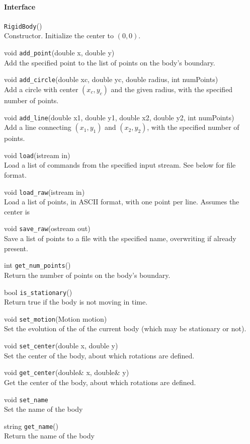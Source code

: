 \documentclass[11pt]{article}
\def\fn#1{{\tt #1}} %
\begin{document}
\paragraph{Interface}
\begin{description}
	\item \fn{RigidBody}() \\
		Constructor.  Initialize the center to $(0,0)$.
	\item void \fn{add\_point}(double x, double y) \\
		Add the specified point to the list of points on the body's boundary.
	\item void \fn{add\_circle}(double xc, double yc, double radius, int numPoints) \\
		Add a circle with center $(x_c,y_c)$ and the given radius, with the specified number of points.
	\item void \fn{add\_line}(double x1, double y1, double x2, double y2, int numPoints) \\
		Add a line connecting $(x_1,y_1)$ and $(x_2,y_2)$, with the specified number of points.
	\item void \fn{load}(istream in) \\
		Load a list of commands from the specified input stream.  See below for file format.
	\item void \fn{load\_raw}(istream in) \\
		Load a list of points, in ASCII format, with one point per line.  Assumes the center is 
	\item void \fn{save\_raw}(ostream out) \\
		Save a list of points to a file with the specified name, overwriting if already present.
	\item int \fn{get\_num\_points}() \\
		Return the number of points on the body's boundary.
	\item bool \fn{is\_stationary}() \\
		Return true if the body is not moving in time.
	\item void \fn{set\_motion}(Motion motion) \\
		Set the evolution of the of the current body (which may be stationary or not).
	\item void \fn{set\_center}(double x, double y) \\
		Set the center of the body, about which rotations are defined.
	\item void \fn{get\_center}(double\& x, double\& y)\\
		Get the center of the body, about which rotations are defined.
	\item void \fn{set\_name} \\
		Set the name of the body
	\item string \fn{get\_name}() \\
		Return the name of the body
	\item 
\end{description}
\end{document}
